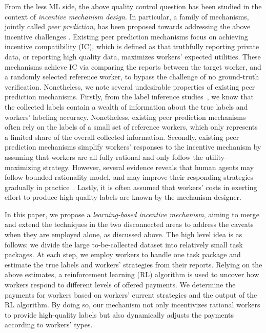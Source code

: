 From the less ML side, the above quality control question has been studied in the context of \emph{incentive mechanism design}. In particular, a family of mechanisms, jointly called \emph{peer prediction}, has been proposed towards addressing the above incentive challenges \cite{prelec2004bayesian,jurca2009mechanisms,witkowski2012peer,dasgupta2013crowdsourced}. Existing peer prediction mechanisms focus on achieving incentive compatibility (IC), which is defined as that truthfully reporting private data, or reporting high quality data, maximizes workers' expected utilities. These mechanisms achieve IC via comparing the reports between the target worker, and a randomly selected reference worker, to bypass the challenge of no ground-truth verification.
Nonetheless, we note several undesirable properties of existing peer prediction mechanisms.
Firstly, from the label inference studies~\cite{zheng2017truth}, we know that the collected labels contain a wealth of information about the true labels and workers' labeling accuracy. Nonetheless, existing peer prediction mechanisms often rely on the labels of a small set of reference workers, which only represents a limited share of the overall collected information.
Secondly, existing peer prediction mechanisms simplify workers' responses to the incentive mechanism by assuming that workers are all fully rational and only follow the utility-maximizing strategy.
However, several evidence reveals that human agents may follow bounded-rationality model, and may improve their responding strategies gradually in practice~\cite{simon1982models,chastain2014algorithms,gao2014trick}. Lastly, it is often assumed that workers' costs in exerting effort to produce high quality labels are known by the mechanism designer. 



In this paper, we propose a \emph{learning-based incentive mechanism}, aiming to merge and extend the techniques in the two disconnected areas to address the caveats when they are employed alone, as discussed above.
The high level idea is as follows: we divide the large to-be-collected dataset into relatively small task packages. At each step, we employ workers to handle one task package and estimate the true labels and workers' strategies from their reports.
Relying on the above estimates, a reinforcement learning (RL) algorithm is used to uncover how workers respond to different levels of offered payments.
We determine the payments for workers based on workers' current strategies and the output of the RL algorithm.
By doing so, our mechanism not only incentivizes rational workers to provide high-quality labels but also dynamically adjusts the payments according to workers' types.

